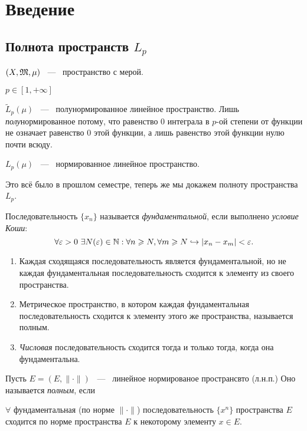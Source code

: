 \section{Введение}
\subsection{Полнота пространств $L_p$}

\noindent

$(X, \mathfrak{M}, \mu)$ ~---~ пространство с мерой.

$p \in [1, +\infty]$

$\widetilde L_p (\mu)$  ~---~ полунормированное линейное пространство. Лишь \textit{полу}нормированное потому, что равенство 0 интеграла в $p$-ой степени от функции не означает равенство 0 этой функции, а лишь равенство этой функции нулю почти всюду.

$L_p (\mu)$ ~---~ нормированное линейное пространство.

Это всё было в прошлом семестре, теперь же мы докажем полноту пространства $L_p$.

\begin{reminder}
    Последовательность $\{ x_{n} \}$ называется \textit{фундаментальной}, если выполнено \textit{условие Коши}:
$$ \forall \varepsilon > 0 \  \exists N (\varepsilon) \in \mathbb{N}: \forall n \geqslant N, \forall m \geqslant N \hookrightarrow |x_{n} - x_{m}| < \varepsilon. $$
\begin{enumerate}
    \item Каждая сходящаяся последовательность является фундаментальной, но не каждая фундаментальная последовательность сходится к элементу из своего пространства.
    \item Метрическое пространство, в котором каждая фундаментальная последовательность сходится к элементу этого же пространства, называется полным.
    \item \textit{Числовая} последовательность сходится тогда и только тогда, когда она фундаментальна.
\end{enumerate}

\end{reminder}

\begin{definition}
	Пусть $E = (E, \|\cdot\|)$  ~---~ линейное нормированое пространсвто (л.н.п.) Оно называется \textit{полным}, если
	
	$\forall$ фундаментальная (по норме $\|\cdot\|$) последовательность $\{x^n\}$ пространства $E$ сходится по норме пространства $E$ к некоторому элементу $x \in E$.
\end{definition}

